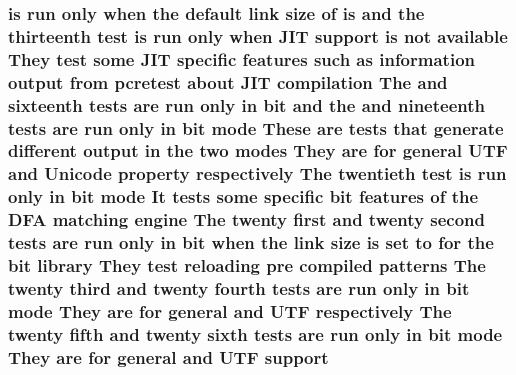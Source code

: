 \subsubsection[{\texorpdfstring{support}{support}}]{ {\bf is} {\bf run} only when the {\bf default} link {\bf size} {\bf of} {\bf is} and the thirteenth test {\bf is} {\bf run} only when J\+IT support {\bf is} {\bf not} {\bf available} They test some J\+IT specific {\bf features} such {\bf as} information {\bf output} {\bf from} {\bf pcretest} about J\+IT {\bf compilation} The and sixteenth {\bf tests} {\bf are} {\bf run} only {\bf in} {\bf bit} and the and nineteenth {\bf tests} {\bf are} {\bf run} only {\bf in} {\bf bit} {\bf mode} These {\bf are} {\bf tests} that generate different {\bf output} {\bf in} the two {\bf modes} They {\bf are} for general U\+TF and {\bf Unicode} property {\bf respectively} The twentieth test {\bf is} {\bf run} only {\bf in} {\bf bit} {\bf mode} It {\bf tests} some specific {\bf bit} {\bf features} {\bf of} the D\+FA {\bf matching} engine The twenty {\bf first} and twenty {\bf second} {\bf tests} {\bf are} {\bf run} only {\bf in} {\bf bit} when the link {\bf size} {\bf is} {\bf set} {\bf to} for the {\bf bit} {\bf library} They test reloading pre {\bf compiled} {\bf patterns} The twenty third and twenty fourth {\bf tests} {\bf are} {\bf run} only {\bf in} {\bf bit} {\bf mode} They {\bf are} for general and U\+TF {\bf respectively} The twenty fifth and twenty sixth {\bf tests} {\bf are} {\bf run} only {\bf in} {\bf bit} {\bf mode} They {\bf are} for general and U\+TF support}\hypertarget{README_8txt_a70b94bbbc2213591c6818d1b57dd7873}{}\label{README_8txt_a70b94bbbc2213591c6818d1b57dd7873}
